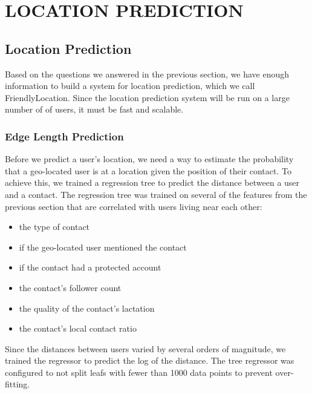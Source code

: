 \ifdefined\THESIS
    \chapter{\uppercase{Location Prediction}}
\else
    \section{Location Prediction}
\fi

Based on the questions we answered in the previous section, we have enough
information to build a system for location prediction, which we call
FriendlyLocation.
Since the location prediction system will be run on a large number of of users,
it must be fast and scalable.

\subsection{Edge Length Prediction}



Before we predict a user's location, we need a way to estimate the probability
that a geo-located user is at a location given the position of their contact.
%
To achieve this, we trained a regression tree to predict the distance between a
user and a contact.
%
The regression tree was trained on several of the features from the previous
section that are correlated with users living near each other:
\begin{itemize}
\item the type of contact
\item if the geo-located user mentioned the contact
\item if the contact had a protected account
\item the contact's follower count
\item the quality of the contact's lactation
\item the contact's local contact ratio
\end{itemize}
%
Since the distances between users varied by several orders of magnitude, we
trained the regressor to predict the log of the distance.
%
The tree regressor was configured to not split leafs with fewer than 1000 data
points to prevent over-fitting.


